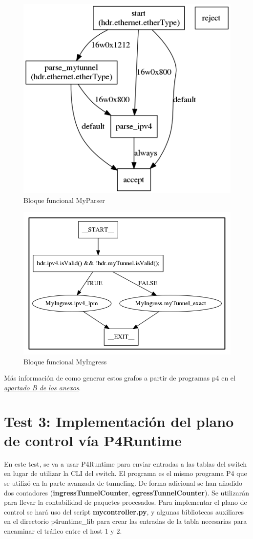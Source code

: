 \begin{figure}[!htb]
  \centering
    \includegraphics[width=0.7\linewidth]{./img/test/17.png}
    \caption{Bloque funcional MyParser}
  \label{fig:yo}
\end{figure}
\begin{figure}[!htb]
  \centering
    \includegraphics[width=0.7\linewidth]{./img/test/18.png}
    \caption{Bloque funcional MyIngress}
  \label{fig:yo}
\end{figure}
Más información de como generar estos grafos a partir de programas p4 en el \hyperref[chap:como generar grafos desde programas p4]{\textit{apartado B de los anexos}}. 
\newpage
\section{Test 3: Implementación del plano de control vía P4Runtime}
En este test, se va a usar P4Runtime para enviar entradas a las tablas del switch en lugar de utilizar la CLI del switch. El programa es el mismo programa P4 que se utilizó en la parte avanzada de tunneling. De forma adicional se han añadido dos contadores (\textbf{ingressTunnelCounter}, \textbf{egressTunnelCounter}). Se utilizarán para llevar la contabilidad de paquetes procesados.\newline
\newline
Para implementar el plano de control se hará uso del script \textbf{mycontroller.py}, y algunas bibliotecas auxiliares en el directorio p4runtime\_lib para crear las entradas de la tabla necesarias para encaminar el tráfico entre el host 1 y 2.

